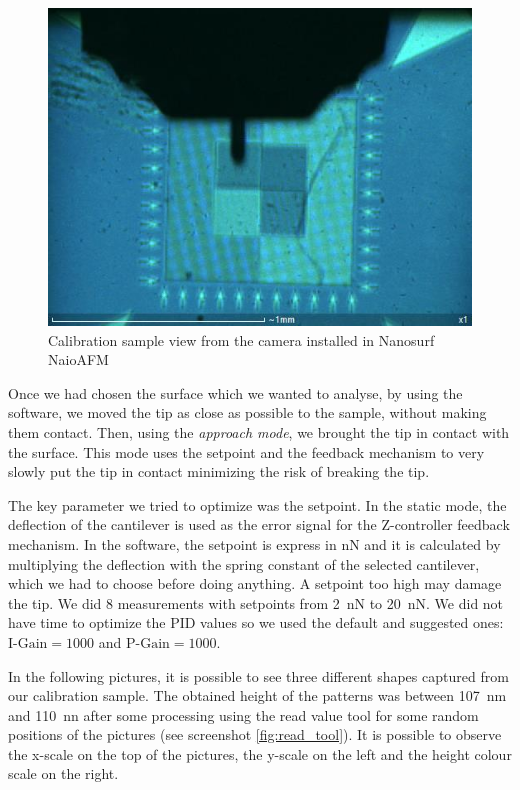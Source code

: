 \documentclass[11pt,a4paper]{article}
\begin{document}
\begin{figure}[ht]
\centering
\includegraphics[scale=0.4]{calibration_sample}
\caption{Calibration sample view from the camera installed in Nanosurf NaioAFM}
\label{fig:cal_sam}
\end{figure}

Once we had chosen the surface which we wanted to analyse, by using the software, we moved the tip as close as possible to the sample, without making them contact. Then, using the \emph{approach mode}, we brought the tip in contact with the surface. This mode uses the setpoint and the feedback mechanism to very slowly put the tip in contact minimizing the risk of breaking the tip.

The key parameter we tried to optimize was the setpoint. In the static mode, the deflection of the cantilever is used as the error signal for the Z-controller feedback mechanism. In the software, the setpoint is express in \si{\nano N} and it is calculated by multiplying the deflection with the spring constant of the selected cantilever, which we had to choose before doing anything. A setpoint too high may damage the tip. We did 8 measurements with setpoints from \SI{2}{\nano N} to \SI{20}{\nano N}. We did not have time to optimize the PID values so we used the default and suggested ones: $\text{I-Gain}=1000$ and $\text{P-Gain}=1000$.

In the following pictures, it is possible to see three different shapes captured from our calibration sample. The obtained height of the patterns was between \SI{107}{\nano m} and \SI{110}{\nano n} after some processing using the read value tool for some random positions of the pictures (see screenshot \ref{fig:read_tool}). It is possible to observe the x-scale on the top of the pictures, the y-scale on the left and the height colour scale on the right.
\end{document}
